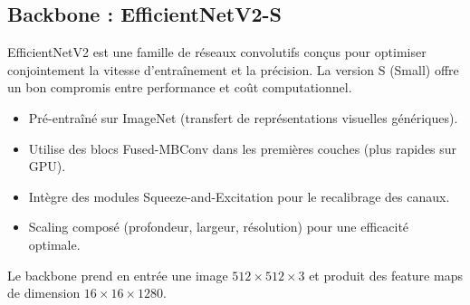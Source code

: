 ﻿\documentclass[11pt,a4paper]{article}
\begin{document}
\begin{center}
\end{center}

\subsection{Backbone : EfficientNetV2-S}

EfficientNetV2 est une famille de réseaux convolutifs conçus pour optimiser conjointement la vitesse d'entraînement et la précision. La version S (Small) offre un bon compromis entre performance et coût computationnel.

\begin{infobox}
\begin{itemize}[leftmargin=1.5em]
  \item Pré-entraîné sur ImageNet (transfert de représentations visuelles génériques).
  \item Utilise des blocs Fused-MBConv dans les premières couches (plus rapides sur GPU).
  \item Intègre des modules Squeeze-and-Excitation pour le recalibrage des canaux.
  \item Scaling composé (profondeur, largeur, résolution) pour une efficacité optimale.
\end{itemize}
\end{infobox}

Le backbone prend en entrée une image $512 \times 512 \times 3$ et produit des feature maps de dimension $16 \times 16 \times 1280$.
\end{document}
